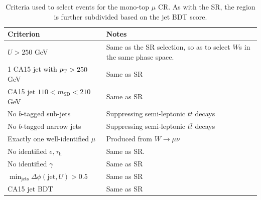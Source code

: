 \begin{table}[]
    \caption{Criteria used to select events for the mono-top $\mu$ CR. As with the SR, the region is further subdivided based on the jet BDT score.}
    \label{tab:mt:wmn_cuts}
    \centering
    \begin{tabular}{p{}p{}}
        Criterion & Notes \\
        \hline
        \hline
        $U>250$ GeV & Same as the SR selection, so as to select $W$s in the same phase space. \\
        1 CA15 jet with $p_\mathrm{T}>250$ GeV &  Same as SR \\
        CA15 jet $110 < m_\mathrm{SD} < 210$ GeV & Same as SR \\
        No $b$-tagged sub-jets & Suppressing semi-leptonic $t\bar{t}$ decays \\
        No $b$-tagged narrow jets & Suppressing semi-leptonic $t\bar{t}$ decays \\
        \hline
        Exactly one well-identified $\mu$ & Produced from $W\rightarrow\mu\nu$ \\
        No identified $e,\tau_\mathrm{h}$ & Same as SR. \\
        No identified $\gamma$ & Same as SR \\
        \hline
        $\min_\mathrm{jets}\Delta\phi(\mathrm{jet},U) > 0.5$ & Same as SR \\
        \hline
        CA15 jet BDT & Same as SR\\
    \end{tabular}
\end{table}

